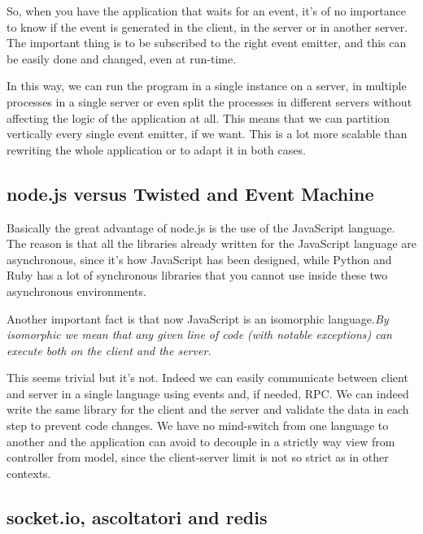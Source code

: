 So, when you have the application that waits for an event, it's of no importance to know if the event is generated in the client, in the server or in another server. The important thing is to be subscribed to the right event emitter, and this can be easily done and changed, even at run-time.

In this way, we can run the program in a single instance on a server, in multiple processes in a single server or even split the processes in different servers without affecting the logic of the application at all. This means that we can partition vertically every single event emitter, if we want. This is a lot more scalable than rewriting the whole application or to adapt it in both cases.

\subsection{node.js versus Twisted and Event Machine}

Basically the great advantage of node.js is the use of the JavaScript language. The reason is that all the libraries already written for the JavaScript language are asynchronous, since it's how JavaScript has been designed, while Python and Ruby has a lot of synchronous libraries that you cannot use inside these two asynchronous environments.

Another important fact is that now JavaScript is an isomorphic language.\textit{By isomorphic we mean that any given line of code (with notable exceptions) can execute both on the client and the server.}\cite{website:isomorfic}

This seems trivial but it's not. Indeed we can easily communicate between client and server in a single language using events and, if needed, RPC. We can indeed write the same library for the client and the server and validate the data in each step to prevent code changes. We have no mind-switch from one language to another and the application can avoid to decouple in a strictly way view from controller from model, since the client-server limit is not so strict as in other contexts.

\subsection{socket.io, ascoltatori and redis}

